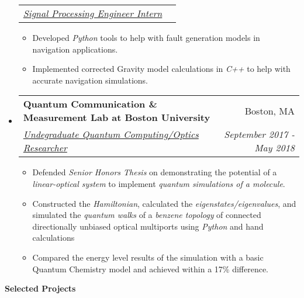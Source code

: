 \documentclass[letterpaper, 8pt]{extarticle}
\makeatletter
\newcommand{\resitem}[1]{\item #1 \vspace{-2pt}}
\newcommand{\resheading}[1]{{\large \colorbox{mygrey}{\begin{minipage}{0.99\textwidth}{\textbf{#1 \vphantom{p\^{E}}}}\end{minipage}}}}
\newcommand{\ressubheading}[4]{
\begin{tabular*}{7.40in}{l@{\extracolsep{\fill}}r}
		\textbf{#1} & #2 \\
		\textit{#3} & \textit{#4} \\
\end{tabular*}\vspace{-6pt}}
\newcommand{\rehead}[2]{
\begin{tabular*}{7.40in}{l@{\extracolsep{\fill}}r}
        \textit{#1} & \textit{#2} \\
\end{tabular*}\vspace{-6pt}}
\makeatother
\begin{document}
\begin{itemize}
\begin{itemize}
	\end{itemize}
	\vspace{-3pt}
	\rehead{\underline{Signal Processing Engineer Intern}}{}
	\begin{itemize}
		\resitem{Developed \emph{Python} tools to help with fault generation models in navigation applications.}
		\resitem{Implemented corrected Gravity model calculations in \emph{C++} to help with accurate navigation simulations.}
	\end{itemize}
\item
	\ressubheading{Quantum Communication \& Measurement Lab at Boston University}{Boston, MA}{\underline{Undegraduate Quantum Computing/Optics Researcher}}{September 2017 - May 2018}
	\begin{itemize}
	    \resitem{Defended \emph{Senior Honors Thesis} on demonstrating the potential of a \emph{linear-optical system} to implement \emph{quantum simulations of a molecule}.}
        \resitem{Constructed the \emph{Hamiltonian}, calculated the \emph{eigenstates/eigenvalues}, and simulated the \emph{quantum walks} of a \emph{benzene topology} of connected directionally unbiased optical multiports using \emph{Python} and hand calculations}
        \item{Compared the energy level results of the simulation with a basic Quantum Chemistry model and achieved within a 17\% difference. }
	\end{itemize}
\end{itemize}


\resheading{Selected Projects}
\end{document}
